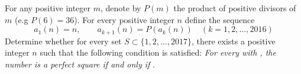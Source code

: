 For any positive integer \(m\), denote by \(P(m)\) the product of positive divisors of \(m\) (e.g \(P(6)=36\)). For every positive integer \(n\) define the sequence
\[a_1(n)=n,\qquad a_{k+1}(n)=P(a_k(n))\quad (k=1,2,\dots,2016)\]Determine whether for every set \(S\subset\{1,2,\dots,2017\}\), there exists a positive integer \(n\) such that the following condition is satisfied:
\textit{For every  with , the number  is a perfect square if and only if }.